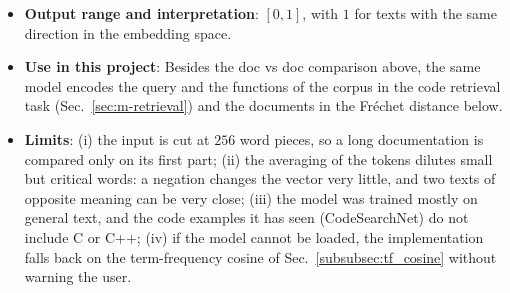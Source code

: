 \begin{itemize}[leftmargin=*, label=\textbullet]
	\item \textbf{Output range and interpretation}: $[0,1]$, with $1$ for texts with the same
	direction in the embedding space.

	\item \textbf{Use in this project}: Besides the doc vs doc comparison above, the same model
	encodes the query and the functions of the corpus in the code retrieval task
	(Sec.~\ref{sec:m-retrieval}) and the documents in the Fréchet distance below.

	\item \textbf{Limits}: (i) the input is cut at $256$ word pieces, so a long documentation is
	compared only on its first part; (ii) the averaging of the tokens dilutes small but critical
	words: a negation changes the vector very little, and two texts of opposite meaning can be
	very close; (iii) the model was trained mostly on general text, and the code examples it has seen
	(CodeSearchNet) do not include C or C++; (iv) if the model cannot be loaded, the implementation falls
	back on the term-frequency cosine of Sec.~\ref{subsubsec:tf_cosine} without warning the user.
\end{itemize}

